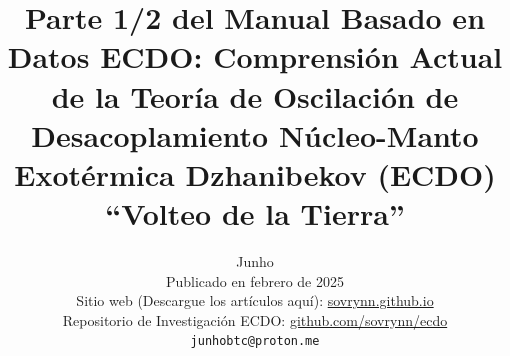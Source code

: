 \documentclass[10pt,twocolumn,letterpaper]{article}
\begin{document}
\title{Parte 1/2 del Manual Basado en Datos ECDO: Comprensión Actual de la Teoría de Oscilación de Desacoplamiento Núcleo-Manto Exotérmica Dzhanibekov (ECDO) “Volteo de la Tierra”}

\author{Junho\\
Publicado en febrero de 2025\\
Sitio web (Descargue los artículos aquí): \href{https://sovrynn.github.io}{sovrynn.github.io}\\
Repositorio de Investigación ECDO: \href{https://github.com/sovrynn/ecdo}{github.com/sovrynn/ecdo}\\
{\tt\small junhobtc@proton.me}
}

\maketitle
\end{document}
